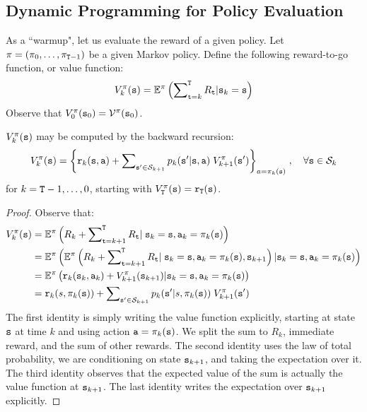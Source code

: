 \subsection{Dynamic Programming for Policy Evaluation}\label{sss:pol_eval}
As a ``warmup", let us evaluate the reward of a given policy. Let
$\pi  = ({\pi _0}, \ldots ,{\pi _{{\tt T} -1}})$ be a
given Markov policy. Define the following reward-to-go function, or
value function:
\[V_k^\pi ({\tt s}) = {\mathbb{E}^\pi }\left( {\sum\nolimits_{{\tt t} = k}^{\tt T} {{R_{\tt t}}|{{\tt s}_k} = {\tt s}} } \right)\]
Observe that $V_0^\pi ({{\tt s}_0}) = {\mathcal{V}^\pi }({{\tt s}_0})$.

\begin{lemma}\label{lem:finite_horizon_VI} $V_k^\pi ({\tt s})$ may be computed by the backward recursion:
\[V_k^\pi ({\tt s}) = {\left\{ {{{\tt r}_k}({\tt s},{\tt a}) + \sum\nolimits_{{\tt s}' \in {\mathcal{S}_{k + 1}}} {{p_k}({\tt s}'|{\tt s},{\tt a})} \;V_{k + 1}^\pi ({\tt s}')} \right\}_{a = {\pi _k}({\tt s})}}\;,\quad \forall {\tt s} \in {\mathcal{S}_k}\]
for $k = {\tt T} -1, \ldots ,0$,  starting with
$V_{\tt T}^\pi ({\tt s}) = {{\tt r}_{\tt T}}({\tt s})$.
\end{lemma}
\begin{proof}
Observe that:
\begin{align*}
V_k^\pi ({\tt s}) &= {\mathbb{E}^\pi }\left( {{R_k} + \sum\nolimits_{{\tt t} = k + 1}^{\tt T} {{R_{\tt t}}|} \;{{\tt s}_k} = {\tt s},{{\tt a}_k} = {\pi _k}({\tt s})} \right)\\
 &= {\mathbb{E}^\pi }\left( {{\mathbb{E}^\pi }\left( {{R_k} + \sum\nolimits_{{\tt t} = k + 1}^{\tt T} {{R_{\tt t}}} |\;{{\tt s}_k} = {\tt s},{{\tt a}_k} = {\pi _k}({\tt s}),{{\tt s}_{k + 1}}} \right)|{{\tt s}_k} = {\tt s},{{\tt a}_k} = {\pi _k}({\tt s})} \right)\\
 &= {\mathbb{E}^\pi }\left( {{\tt r}_k({{\tt s}_k},{{\tt a}_k}) + V_{k + 1}^\pi ({{\tt s}_{k + 1}})|{{\tt s}_k} = {\tt s},{{\tt a}_k} = {\pi _k}({\tt s})} \right)\\
 &= {{\tt r}_k}(s,{\pi _k}({\tt s})) + \sum\nolimits_{{\tt s}' \in {\mathcal{S}_{k + 1}}} {{p_k}({\tt s}'|s,{\pi _k}({\tt s}))} \;V_{k + 1}^\pi ({\tt s}')
\end{align*}
The first identity is simply writing the value function explicitly,
starting at state ${\tt s}$ at time $k$ and using action
${\tt a}=\pi_k({\tt s})$.  We split the sum to $R_k$, immediate
reward, and the sum of other rewards.
The second identity uses the law of total probability, we are
conditioning on state ${\tt s}_{k+1}$, and taking the expectation
over it.
%
The third identity observes that the expected value of the sum is actually the value function at ${\tt s}_{k+1}$. The last identity writes the expectation over ${\tt s}_{k+1}$ explicitly.
\end{proof}

